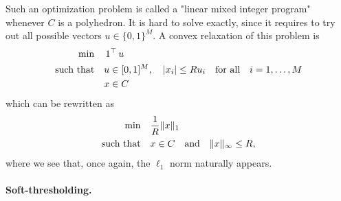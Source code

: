 Such an optimization problem is called a "linear mixed integer program" whenever $C$ is a polyhedron. 
It is hard to solve exactly, since it requires to try out all possible vectors $u \in \{ 0, 1 \}^M$.
A convex relaxation of this problem is
\begin{align*}
	\min \quad &\operatorname{\boldsymbol 1}^\top u \\ 
	\text{such that} \quad &u \in [0, 1]^M, \quad |x_i| \leq R u_i 
	\quad \text{for all} \quad i=1, \ldots, M \\
	&x \in C
\end{align*}
which can be rewritten as
\begin{align*}
	\min \quad &\frac 1R \| x \|_1 \\ 
	\text{such that} \quad &x \in C \quad \text{and} \quad \| x \|_\infty 
	\leq R,
\end{align*}
where we see that, once again, the $\ell_1$ norm naturally appears.


\paragraph{Soft-thresholding.}

